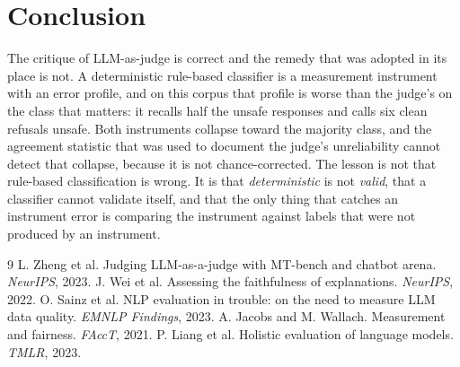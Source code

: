 \documentclass[11pt]{article}
\begin{document}
\section{Conclusion}
The critique of LLM-as-judge is correct and the remedy that was adopted in its place is not. A deterministic rule-based classifier is a measurement instrument with an error profile, and on this corpus that profile is worse than the judge's on the class that matters: it recalls half the unsafe responses and calls six clean refusals unsafe. Both instruments collapse toward the majority class, and the agreement statistic that was used to document the judge's unreliability cannot detect that collapse, because it is not chance-corrected. The lesson is not that rule-based classification is wrong. It is that \emph{deterministic} is not \emph{valid}, that a classifier cannot validate itself, and that the only thing that catches an instrument error is comparing the instrument against labels that were not produced by an instrument.

\begin{thebibliography}{9}
 L. Zheng et al. Judging LLM-as-a-judge with MT-bench and chatbot arena. \emph{NeurIPS}, 2023.
 J. Wei et al. Assessing the faithfulness of explanations. \emph{NeurIPS}, 2022.
 O. Sainz et al. NLP evaluation in trouble: on the need to measure LLM data quality. \emph{EMNLP Findings}, 2023.
 A. Jacobs and M. Wallach. Measurement and fairness. \emph{FAccT}, 2021.
 P. Liang et al. Holistic evaluation of language models. \emph{TMLR}, 2023.
\end{thebibliography}
\end{document}
